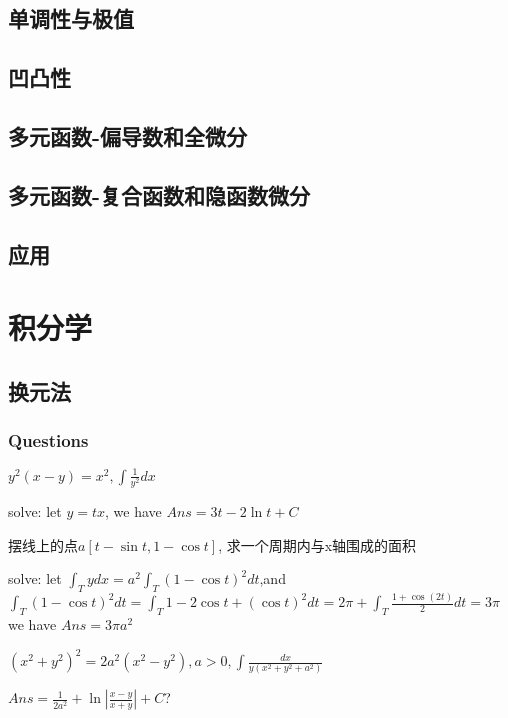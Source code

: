 \documentclass[UTF8]{../../09-Mathematics}
\begin{document}
\section{单调性与极值}
\section{凹凸性}

\section{多元函数-偏导数和全微分}

\section{多元函数-复合函数和隐函数微分}


\section{应用}




\chapter{积分学}

\section{换元法}

\subsection{Questions}

\begin{question}
    $y^2(x-y) = x^2, \int \frac{1}{y^2}dx$

    solve: let $y = tx$, we have $Ans = 3t-2\ln t + C $
\end{question} 

\begin{question}
    摆线上的点$a[t- \sin t, 1- \cos t]$, 求一个周期内与x轴围成的面积

    solve: let $\int _T y dx = a^2 \int _T (1- \cos t)^2 dt$,and $\int _T (1- \cos t)^2 dt = \int _T 1- 2 \cos t + (\cos t)^2 dt = 2 \pi + \int _T \frac{1 + \cos (2t)}{2}dt = 3 \pi$ we have $Ans = 3\pi a^2 $
\end{question} 

\begin{question}
    $(x^2 + y^2)^2 = 2a^2(x^2-y^2), a>0, \int \frac{dx}{y(x^2 + y^2+ a^2)}$

    $Ans = \frac{1}{2a^2} + \ln |\frac{x-y}{x+y}| + C $?
\end{question} 
\end{document}
